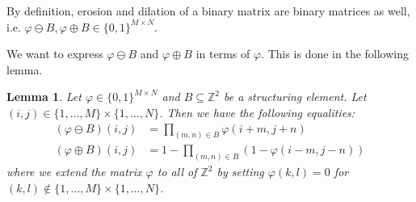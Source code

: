 \documentclass[a4paper,12pt]{article}
\theoremstyle{plain}
\newtheorem{lemma}[theorem]{Lemma}
\theoremstyle{definition}
\theoremstyle{remark}
\begin{document}
By definition, erosion and dilation of a binary matrix are binary matrices as well, i.e. $\varphi \ominus B, \varphi \oplus B \in \{ 0, 1 \}^{M \times N}$.

We want to express $\varphi \ominus B$ and $\varphi \oplus B$ in terms of $\varphi$. This is done in the following lemma.

\begin{lemma}\label{lemerodil}
	Let $\varphi \in \{ 0, 1 \}^{M \times N}$ and $B \subseteq \mathbb{Z}^2$ be a structuring element. Let $(i, j) \in \{ 1, \dots, M \} \times \{ 1, \dots, N \}$. Then we have the following equalities:
	\begin{align}
		(\varphi \ominus B)(i, j) &= \prod_{(m, n) \in B} \varphi(i + m, j + n) \label{eqero} \\
		(\varphi \oplus B)(i, j) &= 1 - \prod_{(m, n) \in B} ( 1 - \varphi(i - m, j - n) ) \label{eqdil}
	\end{align}
	where we extend the matrix $\varphi$ to all of $\mathbb{Z}^2$ by setting $\varphi(k, l) = 0$ for $(k, l) \notin \{ 1, \dots, M \} \times \{ 1, \dots, N \}$.
\end{lemma}
\end{document}
